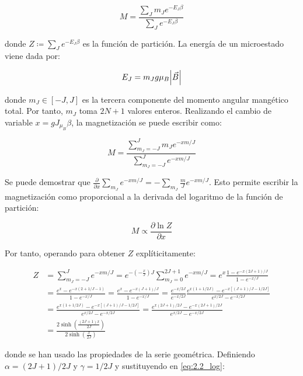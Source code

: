 \documentclass{tufte-book}
\begin{document}
\begin{equation}
M=\frac{\sum_J m_Je^{-E_J\beta}}{\sum_J e^{-E_J\beta}}
\end{equation}

donde $Z ≔ \sum_J e^{-E_J\beta}$ es la función de partición.
La energía de un microestado viene dada por:

\begin{equation}
E_J=m_J g \mu_B\abs{\vec{B}}
\end{equation}

donde $m_J \in \left[ -J,J \right]$ es la tercera componente del
momento angular mangético total. Por tanto, $m_J$ toma $2N+1$ valores
enteros. Realizando el cambio de variable $x=gJ_{\mu_B}\beta$, la
magnetización se puede escribir como:

\begin{equation}
M=\frac{\displaystyle \sum_{m_J=-J}^{J}m_Je^{-xm/J}}{\displaystyle\sum_{m_J=-J}^{J}e^{-xm/J}}
\end{equation}

Se puede demostrar que
$\frac{\partial}{\partial x}\sum_{m_J} e^{-xm/J}=-\sum_{m_J}
\frac{m}{J} e^{-xm/J}$. Esto permite escribir la magnetización como
proporcional a la derivada del logaritmo de la función de partición:

\begin{equation}
M\propto\frac{\partial \ln Z}{\partial x}
\label{eq:2.2_log}
\end{equation}


Por tanto, operando para obtener $Z$ explíticitamente:

\begin{align*}
Z&=\sum^J_{m_J=-J}e^{-xm/J}=e^{-\left( -\frac{x}{J}\right)J}\sum^{2J+1}_{m_J=0}e^{-xm/J}=
e^x\frac{1-e^{-x\left( 2J+1 \right)/J}}{1-e^{-x/J}}\\
&=\frac{e^x-e^{-x\left( 2+1/J -1\right)}}{1-e^{-x/J}}=\frac{e^x-e^{-x\left( J+1\right)/J}}{1-e^{-x/J}}=\frac{e^{-x/2J}}{e^{-x/2J}}\frac{e^{x(1+1/2J)}-e^{-x[(J+1)/J-1/2J]}}{e^{x/2J}-e^{-x/2J}}\\
&=\frac{e^{x(1+1/2J)}-e^{-x[(J+1)/J-1/2J]}}{e^{x/2J}-e^{-x/2J}}=\frac{e^{x(2J+1)/2J}-e^{-x(2J+1)/2J}}{e^{x/2J}-e^{-x/2J}}\\
&=\frac{2\sinh\left( \frac{(2J+1)x}{2J} \right)}{2\sinh \left(\frac{x}{2J}\right)}
\end{align*}

donde se han usado las propiedades de la serie geométrica. Definiendo
$\alpha=(2J+1)/2J$ y $\gamma=1/2J$ y sustituyendo en
\eqref{eq:2.2_log}:
\end{document}
